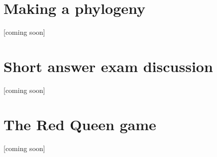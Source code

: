 \documentclass[
  a4paper]{book}
\begin{document}
\hypertarget{making-a-phylogeny-1}{%
\section{Making a phylogeny}\label{making-a-phylogeny-1}}

{[}coming soon{]}

\hypertarget{short-answer-exam-discussion-1}{%
\section{Short answer exam
discussion}\label{short-answer-exam-discussion-1}}

{[}coming soon{]}

\hypertarget{the-red-queen-game-1}{%
\section{The Red Queen game}\label{the-red-queen-game-1}}

{[}coming soon{]}

\backmatter
\end{document}

